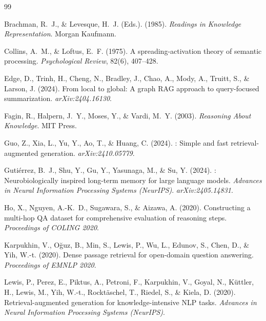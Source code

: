 \documentclass[11pt,a4paper]{article}
\begin{document}
\begin{thebibliography}{99}

Brachman, R.~J., \& Levesque, H.~J. (Eds.). (1985).
\newblock \emph{Readings in Knowledge Representation}.
\newblock Morgan Kaufmann.

Collins, A.~M., \& Loftus, E.~F. (1975).
\newblock A spreading-activation theory of semantic processing.
\newblock \emph{Psychological Review}, 82(6), 407--428.

Edge, D., Trinh, H., Cheng, N., Bradley, J., Chao, A., Mody, A.,
  Truitt, S., \& Larson, J. (2024).
\newblock From local to global: A graph {RAG} approach to query-focused
  summarization.
\newblock \emph{arXiv:2404.16130}.

Fagin, R., Halpern, J.~Y., Moses, Y., \& Vardi, M.~Y. (2003).
\newblock \emph{Reasoning About Knowledge}.
\newblock MIT Press.

Guo, Z., Xia, L., Yu, Y., Ao, T., \& Huang, C. (2024).
: Simple and fast retrieval-augmented generation.
\newblock \emph{arXiv:2410.05779}.

Guti\'{e}rrez, B.~J., Shu, Y., Gu, Y., Yasunaga, M., \& Su, Y. (2024).
: Neurobiologically inspired long-term memory for large
  language models.
\newblock \emph{Advances in Neural Information Processing Systems (NeurIPS)}.
\newblock \emph{arXiv:2405.14831}.

Ho, X., Nguyen, A.-K.~D., Sugawara, S., \& Aizawa, A. (2020).
\newblock Constructing a multi-hop {QA} dataset for comprehensive evaluation
  of reasoning steps.
\newblock \emph{Proceedings of COLING 2020}.

Karpukhin, V., O\u{g}uz, B., Min, S., Lewis, P., Wu, L., Edunov, S.,
  Chen, D., \& Yih, W.-t. (2020).
\newblock Dense passage retrieval for open-domain question answering.
\newblock \emph{Proceedings of EMNLP 2020}.

Lewis, P., Perez, E., Piktus, A., Petroni, F., Karpukhin, V., Goyal, N.,
  K\"{u}ttler, H., Lewis, M., Yih, W.-t., Rockt\"{a}schel, T., Riedel, S.,
  \& Kiela, D. (2020).
\newblock Retrieval-augmented generation for knowledge-intensive {NLP} tasks.
\newblock \emph{Advances in Neural Information Processing Systems (NeurIPS)}.


\end{thebibliography}
\end{document}
